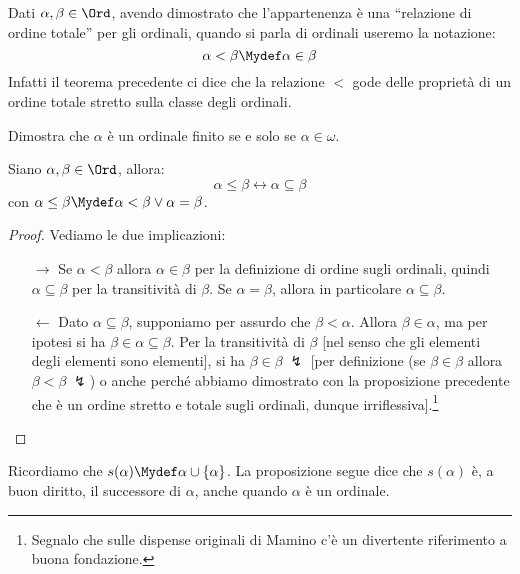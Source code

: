 \documentclass[11pt]{scrartcl}
\begin{document}
\begin{notation}
	Dati $\alpha,\beta \in \Ord$, avendo dimostrato che l'appartenenza è una ``relazione di ordine totale'' per gli ordinali, quando si parla di ordinali useremo la notazione:
	\[ \alpha < \beta \Mydef \alpha \in \beta
		\]
	Infatti il teorema precedente ci dice che la relazione $<$ gode delle proprietà di un ordine totale stretto sulla classe degli ordinali.
\end{notation}

\begin{exercise}
	Dimostra che $\alpha$ è un ordinale finito se e solo se $\alpha \in \omega$.
\end{exercise}

\begin{proposition}
	Siano $\alpha,\beta \in \Ord$, allora:
	\[ \alpha \leq \beta \leftrightarrow \alpha \subseteq \beta
		\]
	con $\alpha \leq \beta \Mydef \alpha < \beta \lor \alpha = \beta$.
\end{proposition}

\begin{proof}
	Vediamo le due implicazioni:
	\begin{itemize}
		\item[$\boxed{\longrightarrow}$] Se $\alpha < \beta$ allora $\alpha \in \beta$ per la definizione di ordine sugli ordinali, quindi $\alpha \subseteq \beta$ per la transitività di $\beta$.
		Se $\alpha = \beta$, allora in particolare $\alpha \subseteq \beta$.
		\item[$\boxed{\longleftarrow}$] Dato $\alpha \subseteq \beta$, supponiamo per assurdo che $\beta < \alpha$. Allora $\beta \in \alpha$, ma per ipotesi si ha $\beta \in \alpha \subseteq \beta$.
		Per la transitività di $\beta$ [nel senso che gli elementi degli elementi sono elementi], si ha $\beta \in \beta\;\lightning$ [per definizione (se $\beta \in \beta$ allora $\beta < \beta \; \lightning$) o anche perché abbiamo dimostrato con la proposizione precedente che è un ordine stretto e totale sugli ordinali, dunque irriflessiva].\footnote{Segnalo che sulle dispense originali di Mamino c'è un divertente riferimento a buona fondazione.}
	\end{itemize}
\end{proof}

Ricordiamo che $s(\alpha) \Mydef \alpha \cup \{\alpha\}$. La proposizione segue dice che $s(\alpha)$ è, a buon diritto, il successore di $\alpha$, anche quando $\alpha$
è un ordinale.
\end{document}
